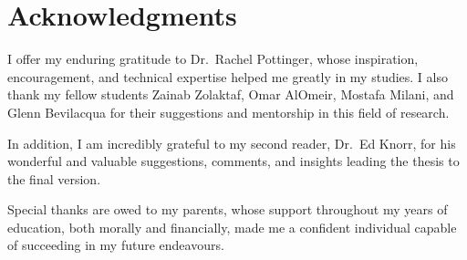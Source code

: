 
\chapter{Acknowledgments}

I offer my enduring gratitude to Dr.\ Rachel Pottinger, whose inspiration, encouragement, and technical expertise helped me greatly in my studies. I also thank my fellow students Zainab Zolaktaf, Omar AlOmeir, Mostafa Milani, and Glenn Bevilacqua for their suggestions and mentorship in this field of research.

In addition, I am incredibly grateful to my second reader, Dr.\ Ed Knorr, for his wonderful and valuable suggestions, comments, and insights leading the thesis to the final version.

Special thanks are owed to my parents, whose support throughout my years of education, both morally and financially, made me a confident individual capable of succeeding in my future endeavours.
\endinput